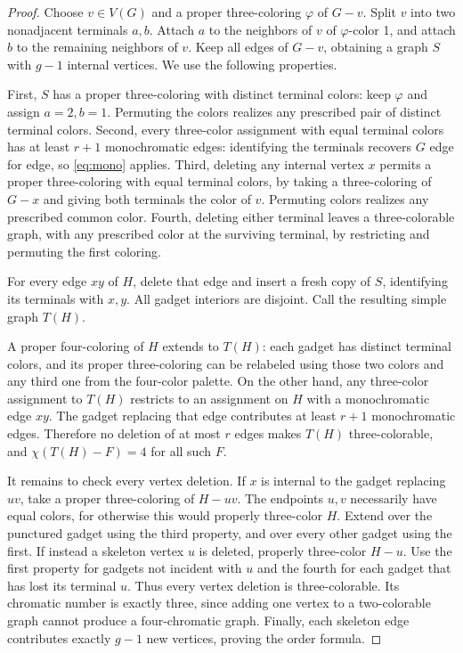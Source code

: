 \documentclass[11pt]{article}
\begin{document}
\begin{proof}
Choose $v\in V(G)$ and a proper three-coloring $\varphi$ of $G-v$.
Split $v$ into two nonadjacent terminals $a,b$. Attach $a$ to the
neighbors of $v$ of $\varphi$-color 1, and attach $b$ to the remaining
neighbors of $v$. Keep all edges of $G-v$, obtaining a graph $S$ with
$g-1$ internal vertices. We use the following properties.

First, $S$ has a proper three-coloring with distinct terminal colors:
keep $\varphi$ and assign $a=2,b=1$. Permuting the colors realizes any
prescribed pair of distinct terminal colors. Second, every three-color
assignment with equal terminal colors has at least $r+1$ monochromatic
edges: identifying the terminals recovers $G$ edge for edge, so
\eqref{eq:mono} applies. Third, deleting any internal vertex $x$ permits
a proper three-coloring with equal terminal colors, by taking a
three-coloring of $G-x$ and giving both terminals the color of $v$.
Permuting colors realizes any prescribed common color. Fourth, deleting
either terminal leaves a three-colorable graph, with any prescribed color
at the surviving terminal, by restricting and permuting the first coloring.

For every edge $xy$ of $H$, delete that edge and insert a fresh copy of
$S$, identifying its terminals with $x,y$. All gadget interiors are
disjoint. Call the resulting simple graph $T(H)$.

A proper four-coloring of $H$ extends to $T(H)$: each gadget has distinct
terminal colors, and its proper three-coloring can be relabeled using
those two colors and any third one from the four-color palette.
On the other hand, any three-color assignment to $T(H)$ restricts to an
assignment on $H$ with a monochromatic edge $xy$. The gadget replacing
that edge contributes at least $r+1$ monochromatic edges. Therefore no
deletion of at most $r$ edges makes $T(H)$ three-colorable, and
$\chi(T(H)-F)=4$ for all such $F$.

It remains to check every vertex deletion. If $x$ is internal to the
gadget replacing $uv$, take a proper three-coloring of $H-uv$.
The endpoints $u,v$ necessarily have equal colors, for otherwise this
would properly three-color $H$. Extend over the punctured gadget using
the third property, and over every other gadget using the first.
If instead a skeleton vertex $u$ is deleted, properly three-color $H-u$.
Use the first property for gadgets not incident with $u$ and the fourth
for each gadget that has lost its terminal $u$. Thus every vertex
deletion is three-colorable. Its chromatic number is exactly three,
since adding one vertex to a two-colorable graph cannot produce a
four-chromatic graph. Finally, each skeleton edge contributes exactly
$g-1$ new vertices, proving the order formula.
\end{proof}
\end{document}
